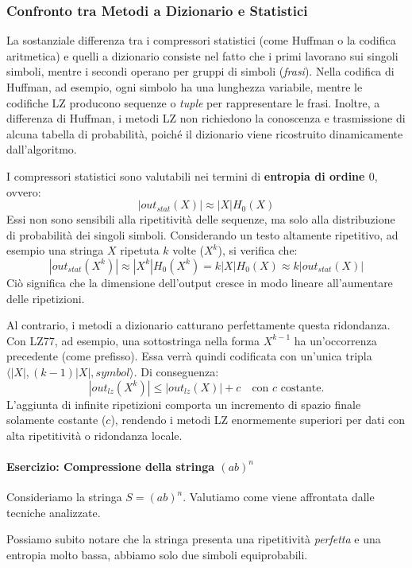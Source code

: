 \subsubsection{Confronto tra Metodi a Dizionario e Statistici}
La sostanziale differenza tra i compressori statistici (come Huffman o la codifica aritmetica) e quelli a dizionario consiste nel fatto che i primi lavorano sui singoli simboli, mentre i secondi operano per gruppi di simboli (\textit{frasi}). 
Nella codifica di Huffman, ad esempio, ogni simbolo ha una lunghezza variabile, mentre le codifiche LZ producono sequenze o \textit{tuple} per rappresentare le frasi. Inoltre, a differenza di Huffman, i metodi LZ non richiedono la conoscenza e trasmissione di alcuna tabella di probabilità, poiché il dizionario viene ricostruito dinamicamente dall'algoritmo.

I compressori statistici sono valutabili nei termini di \textbf{entropia di ordine $0$}, ovvero:
\[|out_{stat}(X)| \approx |X|H_0(X)\]
Essi non sono sensibili alla ripetitività delle sequenze, ma solo alla distribuzione di probabilità dei singoli simboli. Considerando un testo altamente ripetitivo, ad esempio una stringa $X$ ripetuta $k$ volte ($X^k$), si verifica che:
\[|out_{stat}(X^k)| \approx |X^k|H_0(X^k) = k|X|H_0(X) \approx k|out_{stat}(X)|\]
Ciò significa che la dimensione dell'output cresce in modo lineare all'aumentare delle ripetizioni.

Al contrario, i metodi a dizionario catturano perfettamente questa ridondanza. Con LZ77, ad esempio, una sottostringa nella forma $X^{k-1}$ ha un'occorrenza precedente (come prefisso). Essa verrà quindi codificata con un'unica tripla $\langle |X|, (k-1)|X|, \mathit{symbol} \rangle$. Di conseguenza:
\[|out_{lz}(X^k)| \leq |out_{lz}(X)| + c \quad \text{con } c \text{ costante.}\]
L'aggiunta di infinite ripetizioni comporta un incremento di spazio finale solamente costante ($c$), rendendo i metodi LZ enormemente superiori per dati con alta ripetitività o ridondanza locale.

\paragraph{Esercizio: Compressione della stringa $(ab)^n$}
Consideriamo la stringa $S = (ab)^n$. Valutiamo come viene affrontata dalle tecniche analizzate.

Possiamo subito notare che la stringa presenta una ripetitività \textit{perfetta} e una entropia molto bassa, abbiamo solo due simboli equiprobabili. 

